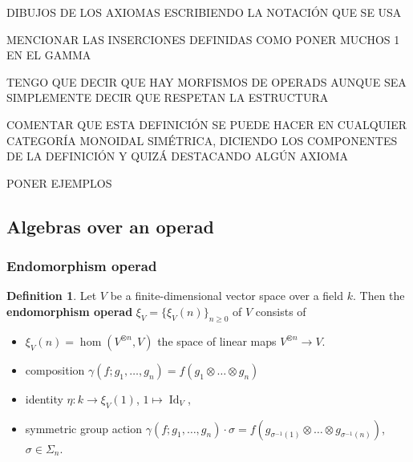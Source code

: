 \documentclass{beamer}
\theoremstyle{definition}
\newtheorem{defi}{Definition}
\begin{document}
\begin{frame}
	DIBUJOS DE LOS AXIOMAS ESCRIBIENDO LA NOTACIÓN QUE SE USA 
	
	MENCIONAR LAS INSERCIONES DEFINIDAS COMO PONER MUCHOS 1 EN EL GAMMA
	
	TENGO QUE DECIR QUE HAY MORFISMOS DE OPERADS AUNQUE SEA SIMPLEMENTE DECIR QUE RESPETAN LA ESTRUCTURA
\end{frame}
\begin{frame}
	COMENTAR QUE ESTA DEFINICIÓN SE PUEDE HACER EN CUALQUIER CATEGORÍA MONOIDAL SIMÉTRICA, DICIENDO LOS COMPONENTES DE LA DEFINICIÓN Y QUIZÁ DESTACANDO ALGÚN AXIOMA
	
   PONER EJEMPLOS
\end{frame}
\subsection{Algebras over an operad}
\begin{frame}
	\frametitle{Endomorphism operad}
	\begin{defi}
		Let $V$ be a finite-dimensional vector space over a field $k$. Then the \textbf{endomorphism operad} $\xi_V = \{ \xi_V(n) \}_{n\geq 0}$ of $V$ consists of
		\begin{itemize}
			\item<1-> $\xi_V(n)=\hom(V^{\otimes n},V)
			$ the space of linear maps $V^{\otimes n} \to V$.
			\item<2-> composition $\gamma(f; g_1, \dots, g_n)= f(g_1\otimes\dots\otimes g_n)$
			\item<3-> identity $\eta: k \to \xi_V(1)$, $1 \mapsto \operatorname{Id}_V$,
			\item<4->  symmetric group action $\gamma (f; g_1, \dots, g_n) \cdot \sigma = f (g_{\sigma^{-1}(1)} \otimes \dots \otimes g_{\sigma^{-1}(n)})$,  $\sigma \in \Sigma_n$.
		\end{itemize}\pause
{}
	\end{defi}
\end{frame}
\end{document}
